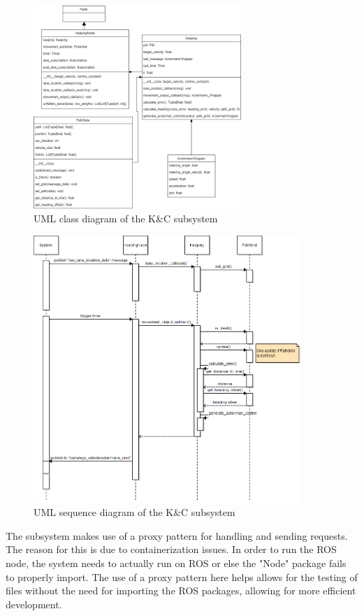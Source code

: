 \documentclass[titlepage, draft]{article}
\begin{document}
{\begin{figure}
	\centering
	\includegraphics[width=0.7\textwidth]{KnC_diagrams}
	\caption{UML class diagram of the K\&C subsystem}
	\label{fig:control_class}
\end{figure}

\begin{figure}
	\centering
	\includegraphics[width=0.9\textwidth]{KnC_sequence.png}
	\caption{UML sequence diagram of the K\&C subsystem}
	\label{fig:control_sequence}
\end{figure}

The subsystem makes use of a proxy pattern for handling and sending requests. The reason for this is due to containerization issues. In order to run the ROS node, the system needs to actually run on ROS or else the "Node" package fails to properly import. The use of a proxy pattern here helps allows for the testing of files without the need for importing the ROS packages, allowing for more efficient development.


}
\end{document}
